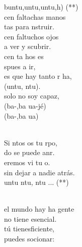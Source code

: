 \documentclass[12pt]{article}
\begin{document}
\begin{multicols*}{2}
\begin{cancion}%
	buntu,untu,untu,h) (**)\\
\jump
	cen faltachas manos \\
	tas para nstruir.\\
	cen faltuchos ojos \\
	a ver y scubrir.\\
	cen ta hos es \\
	spues a ir,\\
	es que hay tanto r ha,\\
	(untu, ntu).\\
	solo no soy capaz,\\
	(ba-,ba ua-jé)\\
	(ba-,ba ua)\\\jump\\
	\begin{chorus}%
	Si ntos os tu rpo,\\
	do se puede anr.\\
	eremos vi tu o. \\
sin dejar a nadie atrás.\\
	untu ntu, ntu ... (**)\\
	\end{chorus}%
	\jump\\
	 el mundo hay ha gente \\
	 no tiene  esencial.\\
	 tú tienesficiente, \\
	puedes socionar:\\

\end{cancion}
\end{multicols*}
\end{document}
